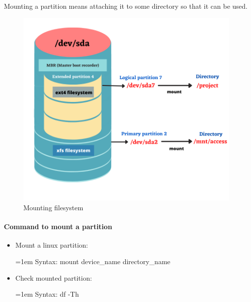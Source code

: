 \setlength{\columnsep}{3pt}
\begin{flushleft}
	

		Mounting a partition means attaching it to some directory so that it can be used. 
		
		\begin{figure}[h!]
			\centering
			\includegraphics[scale=.6]{content/chapter8/images/new.png}
			\caption{Mounting filesystem}
			\label{mounting}
		\end{figure}	
	
	\newpage
	\paragraph{Command to mount a partition}
		\begin{itemize}		
		\item Mount a linux partition:
		\bigskip
		\begin{tcolorbox}[breakable,notitle,boxrule=-0pt,colback=pink,colframe=pink]
			\color{black}
			\font=1em
			Syntax: mount device\_name directory\_name
			\font=4pt
		\end{tcolorbox}
		
		\item Check mounted partition:
		\bigskip
		\begin{tcolorbox}[breakable,notitle,boxrule=-0pt,colback=pink,colframe=pink]
			\color{black}
			\font=1em
			Syntax: df -Th
			\font=4pt
		\end{tcolorbox}
		

\end{itemize}
\end{flushleft}
